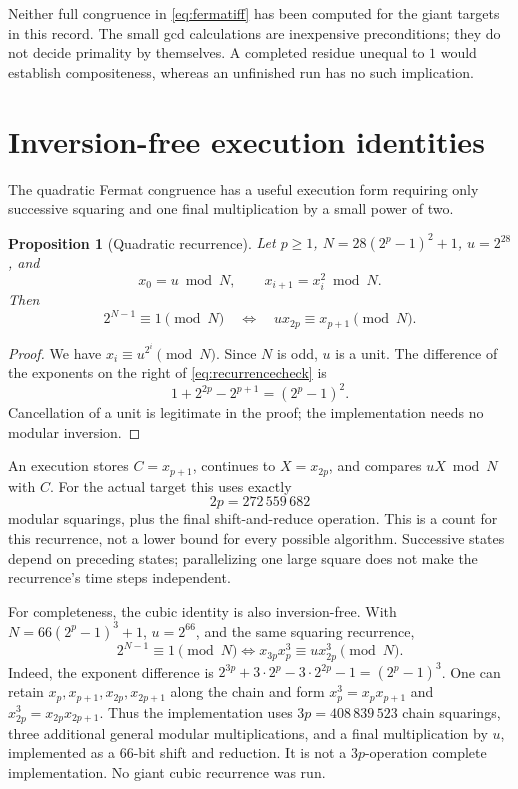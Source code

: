 \documentclass[11pt,a4paper]{article}
\newtheorem{proposition}[theorem]{Proposition}
\theoremstyle{definition}
\begin{document}
Neither full congruence in \eqref{eq:fermatiff} has been computed for the
giant targets in this record. The small gcd calculations are inexpensive
preconditions; they do not decide primality by themselves. A completed
residue unequal to $1$ would establish compositeness, whereas an unfinished run
has no such implication.

\section{Inversion-free execution identities}
\label{sec:recurrence}

The quadratic Fermat congruence has a useful execution form requiring only
successive squaring and one final multiplication by a small power of two.

\begin{proposition}[Quadratic recurrence]\label{prop:recurrence}
Let $p\ge1$, $N=28(2^p-1)^2+1$, $u=2^{28}$, and
\[
 x_0=u\bmod N,\qquad x_{i+1}=x_i^2\bmod N.
\]
Then
\begin{equation}\label{eq:recurrencecheck}
 2^{N-1}\equiv1\pmod N
 \quad\Longleftrightarrow\quad
 u x_{2p}\equiv x_{p+1}\pmod N.
\end{equation}
\end{proposition}

\begin{proof}
We have $x_i\equiv u^{2^i}\pmod N$. Since $N$ is odd, $u$ is a unit.
The difference of the exponents on the right of
\eqref{eq:recurrencecheck} is
\[
 1+2^{2p}-2^{p+1}=(2^p-1)^2.
\]
Cancellation of a unit is legitimate in the proof; the implementation
needs no modular inversion.
\end{proof}

An execution stores $C=x_{p+1}$, continues to $X=x_{2p}$, and compares
$uX\bmod N$ with $C$. For the actual target this uses exactly
\begin{equation}\label{eq:squarecount}
 2p=272\,559\,682
\end{equation}
modular squarings, plus the final shift-and-reduce operation. This is a
count for this recurrence, not a lower bound for every possible algorithm.
Successive states depend on preceding states; parallelizing one large
square does not make the recurrence's time steps independent.

For completeness, the cubic identity is also inversion-free. With
$N=66(2^p-1)^3+1$, $u=2^{66}$, and the same squaring recurrence,
\begin{equation}\label{eq:cubicrecurrence}
 2^{N-1}\equiv1\pmod N
 \Longleftrightarrow
 x_{3p}x_p^3\equiv u x_{2p}^3\pmod N.
\end{equation}
Indeed, the exponent difference is
$2^{3p}+3\cdot2^p-3\cdot2^{2p}-1=(2^p-1)^3$.
One can retain $x_p,x_{p+1},x_{2p},x_{2p+1}$ along the chain and form
$x_p^3=x_p x_{p+1}$ and $x_{2p}^3=x_{2p}x_{2p+1}$.
Thus the implementation uses $3p=408\,839\,523$ chain squarings, three
additional general modular multiplications, and a final multiplication by
$u$, implemented as a 66-bit shift and reduction. It is not a
$3p$-operation complete implementation. No giant cubic recurrence was run.
\end{document}
